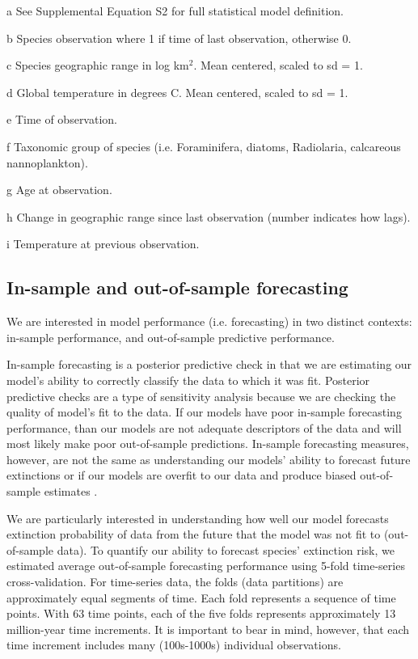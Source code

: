 \documentclass[12pt,letterpaper]{article}
\begin{document}
\begin{refsection}
\begin{table}[ht]
\begin{threeparttable}
{\begin{tabular}{ l p{3cm} l l }
    \hline
   \end{tabular}
  }
  \begin{tablenotes}
  \item[a] See Supplemental Equation S2 for full statistical model definition.
  \item[b] Species observation where 1 if time of last observation, otherwise 0.
  \item[c] Species geographic range in log km\(^2\). Mean centered, scaled to sd = 1.
  \item[d] Global temperature in degrees C. Mean centered, scaled to sd = 1.
  \item[e] Time of observation.
  \item[f] Taxonomic group of species (i.e. Foraminifera, diatoms, Radiolaria, calcareous nannoplankton).
  \item[g] Age at observation.
  \item[h] Change in geographic range since last observation (number indicates how lags).
  \item[i] Temperature at previous observation.
  \end{tablenotes}
 \end{threeparttable}
 \label{tab:model_def}
\end{table}


\subsection{In-sample and out-of-sample forecasting}

We are interested in model performance (i.e. forecasting) in two distinct contexts: in-sample performance, and out-of-sample predictive performance.

In-sample forecasting is a posterior predictive check in that we are estimating our model's ability to correctly classify the data to which it was fit. Posterior predictive checks are a type of sensitivity analysis because we are checking the quality of model's fit to the data. If our models have poor in-sample forecasting performance, than our models are not adequate descriptors of the data and will most likely make poor out-of-sample predictions. In-sample forecasting measures, however, are not the same as understanding our models' ability to forecast future extinctions or if our models are overfit to our data and produce biased out-of-sample estimates \citep{ESL}. 

We are particularly interested in understanding how well our model forecasts extinction probability of data from the future that the model was not fit to (out-of-sample data). To quantify our ability to forecast species' extinction risk, we estimated average out-of-sample forecasting performance using 5-fold time-series cross-validation. For time-series data, the folds (data partitions) are approximately equal segments of time. Each fold represents a sequence of time points. With 63 time points, each of the five folds represents approximately 13 million-year time increments. It is important to bear in mind, however, that each time increment includes many (100s-1000s) individual observations.


\end{refsection}
\end{document}
